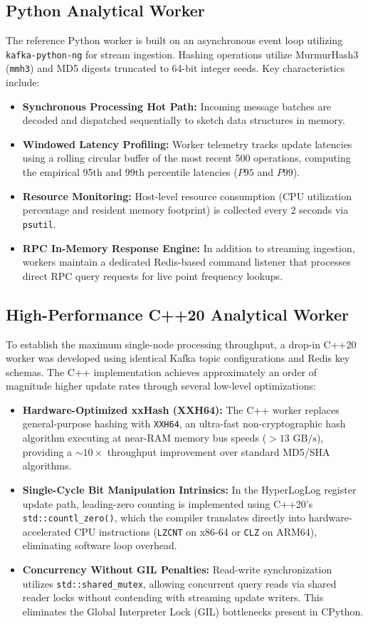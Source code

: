 \subsection{Python Analytical Worker}
The reference Python worker is built on an asynchronous event loop utilizing \texttt{kafka-python-ng} for stream ingestion. Hashing operations utilize MurmurHash3 (\texttt{mmh3}) and MD5 digests truncated to 64-bit integer seeds. Key characteristics include:
\begin{itemize}
 \item \textbf{Synchronous Processing Hot Path:} Incoming message batches are decoded and dispatched sequentially to sketch data structures in memory.
 \item \textbf{Windowed Latency Profiling:} Worker telemetry tracks update latencies using a rolling circular buffer of the most recent 500 operations, computing the empirical 95th and 99th percentile latencies ($P95$ and $P99$).
 \item \textbf{Resource Monitoring:} Host-level resource consumption (CPU utilization percentage and resident memory footprint) is collected every 2 seconds via \texttt{psutil}.
 \item \textbf{RPC In-Memory Response Engine:} In addition to streaming ingestion, workers maintain a dedicated Redis-based command listener that processes direct RPC query requests for live point frequency lookups.
\end{itemize}

\subsection{High-Performance C++20 Analytical Worker}
To establish the maximum single-node processing throughput, a drop-in C++20 worker was developed using identical Kafka topic configurations and Redis key schemas. The C++ implementation achieves approximately an order of magnitude higher update rates through several low-level optimizations:
\begin{itemize}
 \item \textbf{Hardware-Optimized xxHash (XXH64):} The C++ worker replaces general-purpose hashing with \texttt{XXH64}, an ultra-fast non-cryptographic hash algorithm executing at near-RAM memory bus speeds ($>13\text{ GB/s}$), providing a $\sim 10\times$ throughput improvement over standard MD5/SHA algorithms.
 \item \textbf{Single-Cycle Bit Manipulation Intrinsics:} In the HyperLogLog register update path, leading-zero counting is implemented using C++20's \texttt{std::countl\_zero()}, which the compiler translates directly into hardware-accelerated CPU instructions (\texttt{LZCNT} on x86-64 or \texttt{CLZ} on ARM64), eliminating software loop overhead.
 \item \textbf{Concurrency Without GIL Penalties:} Read-write synchronization utilizes \texttt{std::shared\_mutex}, allowing concurrent query reads via shared reader locks without contending with streaming update writers. This eliminates the Global Interpreter Lock (GIL) bottlenecks present in CPython.
\end{itemize}

